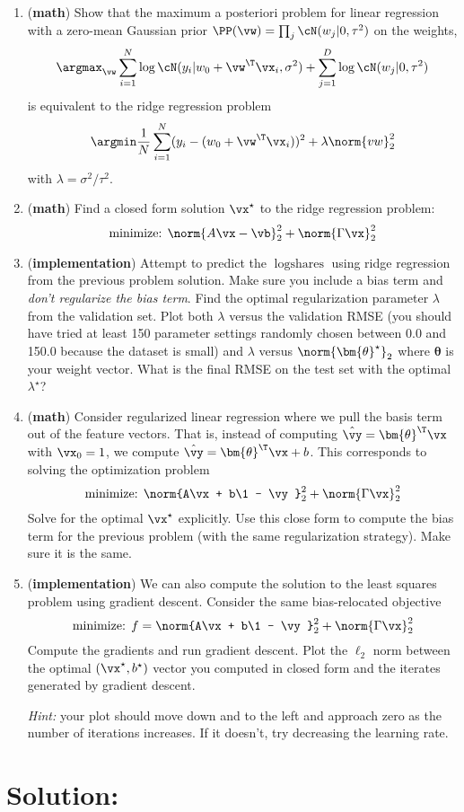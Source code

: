 \documentclass[189]{pset}
\begin{document}
  \begin{enumerate}
    \item (\textbf{math}) Show that the maximum a posteriori problem
      for linear regression with a zero-mean Gaussian prior $\PP(\vw)
      = \prod_j \cN(w_j | 0, \tau^2)$ on the weights,
      \[
        \argmax_\vw \sum_{i=1}^N \log\cN(y_i | w_0 + \vw^\T\vx_i,
        \sigma^2) + \sum_{j=1}^D \log\cN(w_j | 0, \tau^2)
      \]
      is equivalent to the ridge regression problem
      \[
        \argmin \frac{1}{N}\sum_{i=1}^N (y_i - (w_0 + \vw^\T\vx_i))^2
        + \lambda \norm{vw}_2^2
      \]
      with $\lambda = \sigma^2 / \tau^2$.

    \item (\textbf{math}) Find a closed form solution $\vx^\star$ to
      the ridge regression problem:
    \[
      \text{minimize: } \norm{A\vx - \vb}_2^2 + \norm{\Gamma \vx}_2^2
    \]

  \item (\textbf{implementation}) Attempt to predict the
    $\log\text{shares}$ using ridge regression from the previous
    problem solution. Make sure you include a bias term and
    \textit{don't regularize the bias term}. Find the optimal
    regularization parameter $\lambda$ from the validation set. Plot
    both $\lambda$ versus the validation RMSE (you should have tried
    at least 150 parameter settings randomly chosen between 0.0 and
    150.0 because the dataset is small) and $\lambda$ versus
    $\norm{\bm{\theta}^\star}_2$ where $\bm{\theta}$ is your weight
    vector. What is the final RMSE on the test set with the optimal
    $\lambda^\star$?

  \item (\textbf{math}) Consider regularized linear regression where
    we pull the basis term out of the feature vectors. That is,
    instead of computing $\hat\vy = \bm{\theta}^\T\vx$ with $\vx_0 =
    1$, we compute $\hat\vy = \bm{\theta}^\T\vx + b$. This corresponds
    to solving the optimization problem
    \[
      \text{minimize: } \norm{A\vx + b\1 - \vy}_2^2 + \norm{\Gamma \vx}_2^2
    \]
    Solve for the optimal $\vx^\star$ explicitly. Use this close form
    to compute the bias term for the previous problem (with the same
    regularization strategy). Make sure it is the same.
  \item (\textbf{implementation}) We can also compute the solution to
    the least squares problem using gradient descent. Consider the
    same bias-relocated objective
    \[
      \text{minimize: } f = \norm{A\vx + b\1 - \vy}_2^2 + \norm{\Gamma
      \vx}_2^2
    \]
    Compute the gradients and run gradient descent. Plot the $\ell_2$
    norm between the optimal $(\vx^\star, b^\star)$ vector you
    computed in closed form and the iterates generated by gradient
    descent.

    \textit{Hint:} your plot should move down and to the left and
    approach zero as the number of iterations increases. If it
    doesn't, try decreasing the learning rate.
  \end{enumerate}

  \hrulefill

  \clearpage

  \section*{Solution:}
\end{document}
